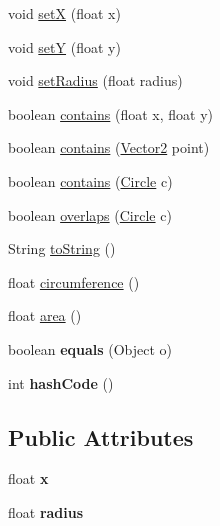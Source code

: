 \begin{DoxyCompactItemize}
void \hyperlink{classairhockeyjava_1_1util_1_1_circle_a6421433e752a0f2d721d9353120247fa}{set\+X} (float x)
\item 
void \hyperlink{classairhockeyjava_1_1util_1_1_circle_ad206832549180fbf514ca54fc09210e4}{set\+Y} (float y)
\item 
void \hyperlink{classairhockeyjava_1_1util_1_1_circle_a7a602a3ed053b2d2268964533ebb776b}{set\+Radius} (float radius)
\item 
boolean \hyperlink{classairhockeyjava_1_1util_1_1_circle_a0ae315aebc51fa48ff7744b117532524}{contains} (float x, float y)
\item 
boolean \hyperlink{classairhockeyjava_1_1util_1_1_circle_aede624f3982d5ed369fa7f2fc7298e47}{contains} (\hyperlink{classairhockeyjava_1_1util_1_1_vector2}{Vector2} point)
\item 
boolean \hyperlink{classairhockeyjava_1_1util_1_1_circle_af7c9ce3acb59ff08903735c1550aaa37}{contains} (\hyperlink{classairhockeyjava_1_1util_1_1_circle}{Circle} c)
\item 
boolean \hyperlink{classairhockeyjava_1_1util_1_1_circle_ab050c8a44bc44999523e43882a38a434}{overlaps} (\hyperlink{classairhockeyjava_1_1util_1_1_circle}{Circle} c)
\item 
String \hyperlink{classairhockeyjava_1_1util_1_1_circle_ad704666ef4bc067c54ccbf932932426b}{to\+String} ()
\item 
float \hyperlink{classairhockeyjava_1_1util_1_1_circle_a305fa2f6088a2568f3ed800bdba6b28d}{circumference} ()
\item 
float \hyperlink{classairhockeyjava_1_1util_1_1_circle_a4c0365354cafb509cb491bd6069d1e51}{area} ()
\item 
\hypertarget{classairhockeyjava_1_1util_1_1_circle_a54ad75fea51e024773031bf9375962ef}{}boolean {\bfseries equals} (Object o)\label{classairhockeyjava_1_1util_1_1_circle_a54ad75fea51e024773031bf9375962ef}

\item 
\hypertarget{classairhockeyjava_1_1util_1_1_circle_aee66037364c368fcc61f1f433537f241}{}int {\bfseries hash\+Code} ()\label{classairhockeyjava_1_1util_1_1_circle_aee66037364c368fcc61f1f433537f241}

\end{DoxyCompactItemize}
\subsection*{Public Attributes}
\begin{DoxyCompactItemize}
\item 
\hypertarget{classairhockeyjava_1_1util_1_1_circle_a9daf3b18ba68b942160faf28b205d624}{}float {\bfseries x}\label{classairhockeyjava_1_1util_1_1_circle_a9daf3b18ba68b942160faf28b205d624}

\item 
\hypertarget{classairhockeyjava_1_1util_1_1_circle_a85bef8b9de8a72cffca68dae5e51764d}{}float {\bfseries radius}\label{classairhockeyjava_1_1util_1_1_circle_a85bef8b9de8a72cffca68dae5e51764d}

\end{DoxyCompactItemize}



